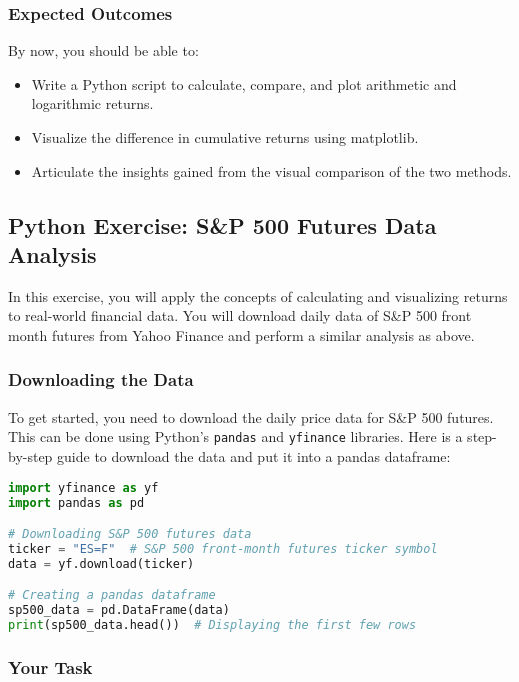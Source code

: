 \documentclass{article}
\begin{document}
\subsubsection{Expected Outcomes}

By now, you should be able to:
\begin{itemize}
    \item Write a Python script to calculate, compare, and plot arithmetic and logarithmic returns.
    \item Visualize the difference in cumulative returns using matplotlib.
    \item Articulate the insights gained from the visual comparison of the two methods.
\end{itemize}

\subsection{Python Exercise: S\&P 500 Futures Data Analysis}

In this exercise, you will apply the concepts of calculating and visualizing returns to real-world financial data. You will download daily data of S\&P 500 front month futures from Yahoo Finance and perform a similar analysis as above.

\subsubsection{Downloading the Data}

To get started, you need to download the daily price data for S\&P 500 futures. This can be done using Python's \texttt{pandas} and \texttt{yfinance} libraries. Here is a step-by-step guide to download the data and put it into a pandas dataframe:

\begin{lstlisting}[language=Python]
import yfinance as yf
import pandas as pd

# Downloading S&P 500 futures data
ticker = "ES=F"  # S&P 500 front-month futures ticker symbol
data = yf.download(ticker)

# Creating a pandas dataframe
sp500_data = pd.DataFrame(data)
print(sp500_data.head())  # Displaying the first few rows
\end{lstlisting}

\subsubsection{Your Task}
\end{document}
